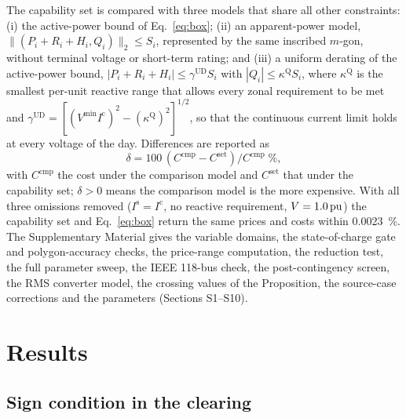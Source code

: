 The capability set is compared with three models that share all other
constraints: (i) the active-power bound of Eq.~\eqref{eq:box}; (ii) an
apparent-power model, $\lVert (P_i + R_i + H_i, Q_i) \rVert_2 \le S_i$,
represented by the same inscribed $m$-gon, without terminal voltage or
short-term rating; and (iii) a uniform derating of the active-power bound,
$|P_i + R_i + H_i| \le \gamma^{\mathrm{UD}} S_i$ with
$|Q_i| \le \kappa^{\mathrm{Q}} S_i$, where $\kappa^{\mathrm{Q}}$ is the
smallest per-unit reactive range that allows every zonal requirement to be
met and $\gamma^{\mathrm{UD}} = [ (V^{\min} I^{\mathrm{c}})^2 -
(\kappa^{\mathrm{Q}})^2 ]^{1/2}$, so that the continuous current limit
holds at every voltage of the day. Differences are
reported as
%
\begin{equation}
  \delta = 100 \, ( C^{\mathrm{cmp}} - C^{\mathrm{set}} ) / C^{\mathrm{cmp}}
  \;\%,
  \label{eq:delta}
\end{equation}
%
with $C^{\mathrm{cmp}}$ the cost under the comparison model and
$C^{\mathrm{set}}$ that under the capability set; $\delta > 0$ means the
comparison model is the more expensive. With all three omissions removed
($I^{\mathrm{s}} = I^{\mathrm{c}}$, no reactive requirement,
$V = \SI{1.0}{\ensuremath{\mathrm{pu}}}$) the capability set and Eq.~\eqref{eq:box} return the
same prices and costs within \SI{0.0023}{\percent}. The Supplementary
Material gives the variable domains, the state-of-charge gate and
polygon-accuracy checks, the price-range computation, the reduction test,
the full parameter sweep, the IEEE 118-bus check, the post-contingency
screen, the RMS converter model, the crossing values of the Proposition,
the source-case corrections and the parameters (Sections S1--S10).

\section{Results}
\label{sec:results}

\subsection{Sign condition in the clearing}
\label{sec:omissions}

